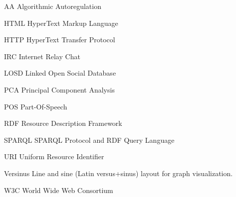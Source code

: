 \documentclass[
12pt,		%
openright,	%
twoside,  %
a4paper,			%
chapter=TITLE,		%
english,			%
french,				%
spanish,			%
brazil				%
]{USPSC}
\begin{document}
\listoffigures*
\cleardoublepage

\listoftables*
\cleardoublepage


\begin{siglas}
	\item[AA] Algorithmic Autoregulation
	\item[HTML] HyperText Markup Language
	\item[HTTP] HyperText Transfer Protocol
	\item[IRC] Internet Relay Chat
	\item[LOSD] Linked Open Social Database
	\item[PCA] Principal Component Analysis
	\item[POS] Part-Of-Speech
	\item[RDF] Resource Description Framework
	\item[SPARQL] SPARQL Protocol and RDF Query Language
	\item[URI] Uniform Resource Identifier
	\item[Versinus] Line and sine (Latin versus+sinus) layout for graph visualization.
	\item[W3C] World Wide Web Consortium
\end{siglas}
% 	
\end{document}
